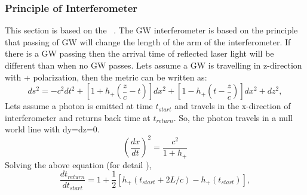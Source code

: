 \documentclass{ttuthes2007}
\begin{document}
\subsubsection{Principle of Interferometer}
This section is based on the ~\cite{Sathyaprakash_2009}. The
\ac{GW} interferometer is based on the principle that passing of \ac{GW} will
change the length of the arm of the interferometer. If there is a \ac{GW}
passing then the arrival time of reflected laser light will be different than when no
\ac{GW} passes. Lets assume a \ac{GW} is travelling in z-direction with +
polarization, then the metric can be written as:
\begin{equation}
ds^2= -c^2dt^2+[1+h_+(\frac{z}{c}-t)]dx^2+[1-h_+(t-\frac{z}{c})]dx^2+dz^2,
\end{equation}
Lets assume a photon is emitted at time $t_{start}$ and travels
in the x-direction of interferometer and returns back time at $t_{return}$. So,
the photon travels in a null world line with dy=dz=0.
\begin{equation}
\left(\frac{dx}{dt}\right)^2=\frac{c^2}{1+h_+}
\end{equation}
Solving the above equation (for detail \cite{Schutz:1985jx}),
\begin{equation}
\frac{dt_{return}}{dt_{start}}=1+\frac{1}{2}[h_+(t_{start}+2L/c)-h_+(t_{start})],
\end{equation}
\end{document}
